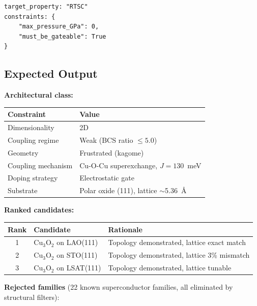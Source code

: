 \documentclass[11pt, a4paper]{article}
\begin{document}
\begin{lstlisting}
target_property: "RTSC"
constraints: {
    "max_pressure_GPa": 0,
    "must_be_gateable": True
}
\end{lstlisting}

\subsection{Expected Output}

\textbf{Architectural class:}
\begin{center}
\begin{tabular}{@{}ll@{}}
\toprule
\textbf{Constraint} & \textbf{Value} \\
\midrule
Dimensionality & 2D \\
Coupling regime & Weak (BCS ratio $\leq 5.0$) \\
Geometry & Frustrated (kagome) \\
Coupling mechanism & Cu-O-Cu superexchange, $J = 130$~meV \\
Doping strategy & Electrostatic gate \\
Substrate & Polar oxide (111), lattice $\sim$5.36~\AA \\
\bottomrule
\end{tabular}
\end{center}

\textbf{Ranked candidates:}
\begin{center}
\begin{tabular}{@{}clp{6cm}@{}}
\toprule
\textbf{Rank} & \textbf{Candidate} & \textbf{Rationale} \\
\midrule
1 & Cu$_3$O$_2$ on LAO(111) & Topology demonstrated,
    lattice exact match \\
2 & Cu$_3$O$_2$ on STO(111) & Topology demonstrated,
    lattice 3\% mismatch \\
3 & Cu$_3$O$_2$ on LSAT(111) & Topology demonstrated,
    lattice tunable \\
\bottomrule
\end{tabular}
\end{center}

\textbf{Rejected families} (22 known superconductor families,
all eliminated by structural filters):
\end{document}
